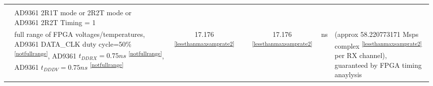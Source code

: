 \documentclass{article}
\begin{document}
\begin{landscape}
\begin{scriptsize}
\begin{longtable}{|c|l|c|c|c|c|l|}
                          &                                      &                                & &                                &                      & \\
                          & \multirow{2}{*}{\parbox{6.7 cm}{\hspace*{12mm}AD9361 2R1T mode or 2R2T mode or \\ \hspace*{12mm}AD9361 2R2T Timing = 1}} & & & & & \\
                          &                                      &                                & &                                &                      & \\
                          & \multirow{5}{*}{\parbox{6.7cm}{\hspace*{15mm}full range of FPGA voltages/temperatures,\\ \hspace*{15mm}AD9361 DATA\_CLK duty cycle=50\% \textsuperscript{\ref{notfullrange}}, \\ \hspace*{15mm}AD9361 $t_{DDRX}=0.75 ns$ \textsuperscript{\ref{notfullrange}}, \\ \hspace*{15mm}AD9361 $t_{DDDV}=0.75ns$ \textsuperscript{\ref{notfullrange}} }} & \multirow{5}{*}{17.176 \textsuperscript{\ref{lessthanmaxsamprate2}}}  & & \multirow{5}{*}{17.176 \textsuperscript{\ref{lessthanmaxsamprate2}}} & \multirow{5}{*}{ns} & \multirow{5}{*}{\parbox{3.0cm}{(approx 58.220773171 Msps complex \textsuperscript{\ref{lessthanmaxsamprate2}} per RX channel), \\ guaranteed by FPGA timing anaylysis}} \\
                          &                                      &                                & &                                &                      & \\
                          &                                      &                                & &                                &                      & \\
                          &                                      &                                & &                                &                      & \\
                          &                                      &                                & &                                &                      & \\
    \cline{2-7}

\end{longtable}
\end{scriptsize}
\end{landscape}
\end{document}
